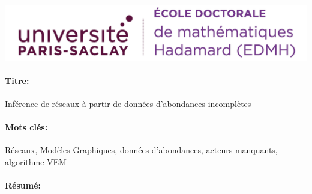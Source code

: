 \documentclass[12pt,a4paper]{book}
\begin{document}
\lhead{}
\rhead{}
\rfoot{}
\cfoot{}
\lfoot{}

\noindent 
\includegraphics[height=2.45cm]{e.png}
\vspace{1cm}

\begin{mdframed}[linecolor=Prune,linewidth=1]
\vspace{-.25cm}
\paragraph*{Titre:} Inférence de réseaux à partir de données d'abondances incomplètes


\begin{small}
\vspace{-.25cm}
\paragraph*{Mots clés:} Réseaux, Modèles Graphiques, données d'abondances, acteurs manquants, algorithme VEM

\vspace{-.5cm}
\begin{multicols}{2}
\paragraph*{Résumé:}  
\end{multicols}
\end{small}
\end{mdframed}
\end{document}
